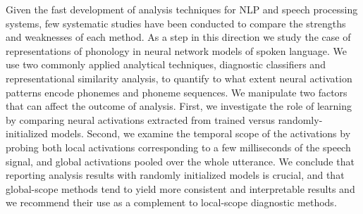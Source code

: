 Given the fast development of analysis techniques for NLP and speech processing systems, few systematic studies have been conducted to compare the strengths and weaknesses of each method.  As a step in this direction we study the case of representations of phonology in neural network models of spoken language. We use two commonly applied analytical techniques, diagnostic classifiers and representational similarity analysis, to quantify to what extent neural activation patterns encode phonemes and phoneme sequences. We manipulate two factors that can affect the outcome of analysis. First, we investigate the role of learning by comparing neural activations extracted from trained versus randomly-initialized models. Second, we examine the temporal scope of the activations by probing both local activations corresponding to a few milliseconds of the speech signal, and global activations pooled over the whole utterance. We conclude that reporting analysis results with randomly initialized models is crucial, and that global-scope methods tend to yield more consistent and interpretable results and we recommend their use as a complement to local-scope diagnostic methods.
